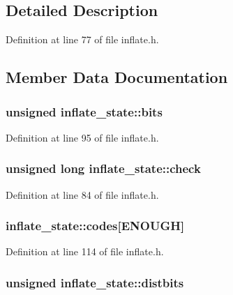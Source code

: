 \subsection{Detailed Description}


Definition at line 77 of file inflate.\-h.



\subsection{Member Data Documentation}
\hypertarget{structinflate__state_ab37c3563f306f29e6ded8e933af14365}{
\subsubsection[{bits}]{\setlength{\rightskip}{0pt plus 5cm}unsigned inflate\-\_\-state\-::bits}}\label{structinflate__state_ab37c3563f306f29e6ded8e933af14365}


Definition at line 95 of file inflate.\-h.

\hypertarget{structinflate__state_ae597e4f5c37b9f7881015384bf826371}{
\subsubsection[{check}]{\setlength{\rightskip}{0pt plus 5cm}unsigned {\bf long} inflate\-\_\-state\-::check}}\label{structinflate__state_ae597e4f5c37b9f7881015384bf826371}


Definition at line 84 of file inflate.\-h.

\hypertarget{structinflate__state_af9581f523a7d8d47fba6cdd73eaf1edc}{
\subsubsection[{codes}]{ inflate\-\_\-state\-::codes\mbox{[}E\-N\-O\-U\-G\-H\mbox{]}}}\label{structinflate__state_af9581f523a7d8d47fba6cdd73eaf1edc}


Definition at line 114 of file inflate.\-h.

\hypertarget{structinflate__state_a98952f3f8f420a05b567f080aca0eb4b}{
\subsubsection[{distbits}]{\setlength{\rightskip}{0pt plus 5cm}unsigned inflate\-\_\-state\-::distbits}}\label{structinflate__state_a98952f3f8f420a05b567f080aca0eb4b}


